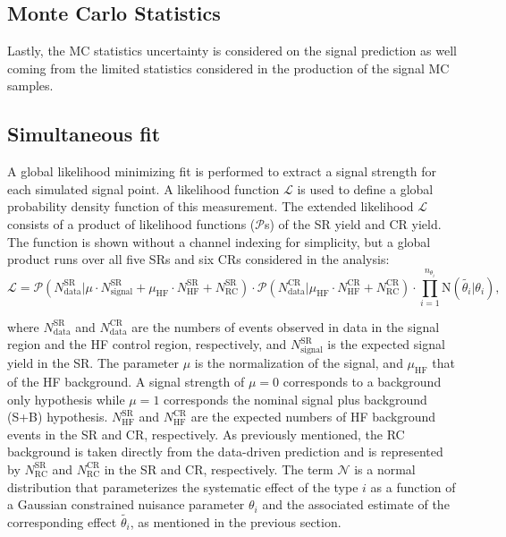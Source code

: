 \subsection*{Monte Carlo Statistics}
Lastly, the MC statistics uncertainty is considered on the signal prediction as well coming from the limited statistics considered in the production of the signal MC samples.

\subsection{Simultaneous fit}
A global likelihood minimizing fit is performed to extract a signal strength for each simulated signal point. A likelihood function $\mathcal{L}$ is used to define a global probability density function of this measurement. The extended likelihood $\mathcal{L}$ consists of a product of likelihood functions ($\mathcal{P}$s) of the SR yield and CR yield. The function is shown without a channel indexing for simplicity, but a global product runs over all five SRs and six CRs considered in the analysis:
\begin{equation}
\label{eqn:likelihood}
    \mathcal{L} = \mathcal{P}( N_{\mathrm{data}}^{\mathrm{SR}}| \mu \cdot N_{\mathrm{signal}}^{\mathrm{SR}} + 
    \mu_{\mathrm{HF}}  \cdot N_{\mathrm{HF}}^{\mathrm{SR}} + N_{\mathrm{RC}}^{\mathrm{SR}} ) \cdot 
    \mathcal{P}(N_{\mathrm{data}}^{\mathrm{CR}} | \mu_{\mathrm{HF}}\cdot N_{\mathrm{HF}}^{\mathrm{CR}} + N_{\mathrm{RC}}^{\mathrm{CR}}) \cdot                                                    \prod_{i=1}^{n_{\theta_i}}\mathrm{N}(\tilde{\theta_i}| \theta_i),
\end{equation}

where $N_{\mathrm{data}}^{\mathrm{SR}}$ and $N_{\mathrm{data}}^{\mathrm{CR}}$ are the numbers of events observed in data in the signal region and the HF control region, respectively, and $N_{\mathrm{signal}}^{\mathrm{SR}}$ is the expected signal yield in the SR. The parameter $\mu$ is the normalization of the signal, and $\mu_{\mathrm{HF}}$ that of the HF background. A signal strength of $\mu=0$ corresponds to a background only hypothesis while $\mu=1$ corresponds the nominal signal plus background (S+B) hypothesis. $N_{\mathrm{HF}}^{\mathrm{SR}}$ and $N_{\mathrm{HF}}^{\mathrm{CR}}$ are the expected numbers of HF background events in the SR and CR, respectively. As previously mentioned, the RC background is taken directly from the data-driven prediction and is represented by $N_{\mathrm{RC}}^{\mathrm{SR}}$ and $N_{\mathrm{RC}}^{\mathrm{CR}}$ in the SR and CR, respectively.  The term $\mathcal{N}$ is a normal distribution that parameterizes the systematic effect of the type $i$ as a function of a Gaussian constrained nuisance parameter $\theta_i$ and the associated estimate of the corresponding effect $\tilde{\theta_i}$, as mentioned in the previous section. 

